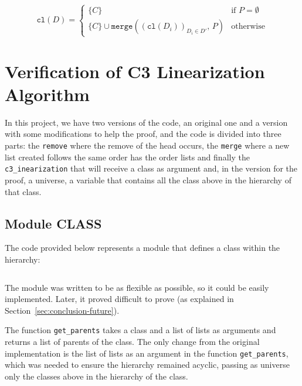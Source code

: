 \documentclass[runningheads]{llncs}
\newcommand*{\mer}{\texttt{merge}}
\begin{document}
\[
\texttt{cl}(D) =
\begin{cases}
\{C\} & \text{if } P = \emptyset \\
\{C\} \cup \mer\left( \left( \texttt{cl}(D_i) \right)_{D_i \in D'},\, P \right) & \text{otherwise}
\end{cases}
\]

\section{Verification of C3 Linearization Algorithm}

In this project, we have two versions of the code, an original one and a version with some modifications to help the proof,
 and the code is divided into three parts: the \texttt{remove} where the remove of the head occurs, 
 the \texttt{merge} where a new list created follows the same order has the order lists and finally the \texttt{c3\_inearization} that will receive a class as argument and,
  in the version for the proof, a universe, a variable that contains all the class above in the hierarchy of that class.

\subsection{Module CLASS}
\label{subsec:CLASS}

The code provided below represents a module that defines a class within the hierarchy:
\inputminted[firstline=4,lastline=22,fontsize=\small,linenos,xleftmargin=20pt]{ocaml}{../cameleer/c3.ml} 
The module was written to be as flexible as possible, so it could be easily implemented.
Later, it proved difficult to prove (as explained in Section~\ref{sec:conclusion-future}).

The function \texttt{get\_parents} takes a class and a list of lists as arguments and returns a list of parents of the class.
The only change from the original implementation is the list of lists as an argument in the function 
\texttt{get\_parents}, which was needed to ensure the hierarchy remained acyclic,
 passing as universe only the classes above in the hierarchy of the class.
\end{document}
